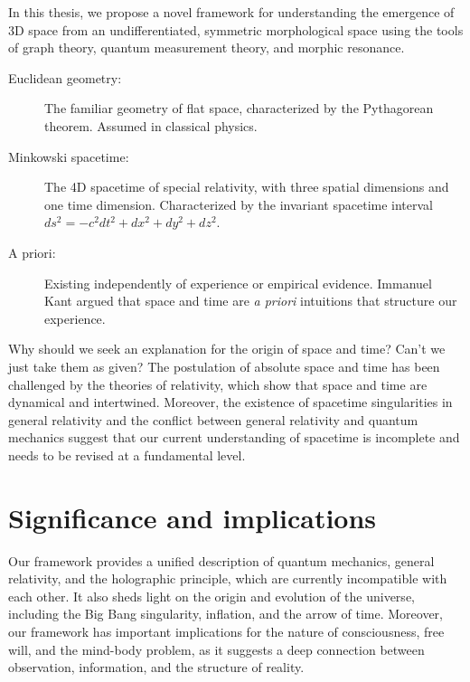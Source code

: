 In this thesis, we propose a novel framework for understanding the emergence of 3D space from an undifferentiated, symmetric morphological space using the tools of graph theory, quantum measurement theory, and morphic resonance.

\begin{tcolorbox}[colback=blue!5!white,colframe=blue!75!black,title=New terms]
\begin{description}
\item[Euclidean geometry:] The familiar geometry of flat space, characterized by the Pythagorean theorem. Assumed in classical physics.
\item[Minkowski spacetime:] The 4D spacetime of special relativity, with three spatial dimensions and one time dimension. Characterized by the invariant spacetime interval $ds^2 = -c^2 dt^2 + dx^2 + dy^2 + dz^2$.
\item[A priori:] Existing independently of experience or empirical evidence. Immanuel Kant argued that space and time are \textit{a priori} intuitions that structure our experience.
\end{description}
\end{tcolorbox}

\begin{tcolorbox}[colback=green!5!white,colframe=green!75!black,title=Question]
Why should we seek an explanation for the origin of space and time? Can't we just take them as given?
\tcblower
The postulation of absolute space and time has been challenged by the theories of relativity, which show that space and time are dynamical and intertwined. Moreover, the existence of spacetime singularities in general relativity and the conflict between general relativity and quantum mechanics suggest that our current understanding of spacetime is incomplete and needs to be revised at a fundamental level.
\end{tcolorbox}

\section{Significance and implications}
Our framework provides a unified description of quantum mechanics, general relativity, and the holographic principle, which are currently incompatible with each other. It also sheds light on the origin and evolution of the universe, including the Big Bang singularity, inflation, and the arrow of time. Moreover, our framework has important implications for the nature of consciousness, free will, and the mind-body problem, as it suggests a deep connection between observation, information, and the structure of reality.

